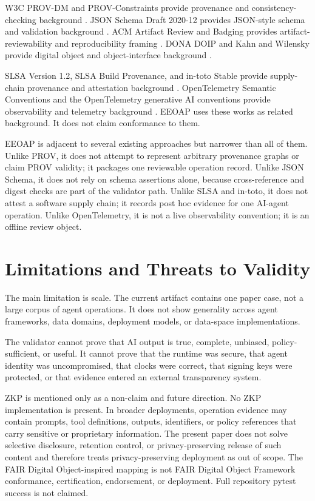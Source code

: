 \documentclass[11pt]{article}
\begin{document}
W3C PROV-DM and PROV-Constraints provide provenance and consistency-checking
background \cite{provdm,provconstraints}. JSON Schema Draft 2020-12 provides
JSON-style schema and validation background \cite{jsonschema}. ACM Artifact
Review and Badging provides artifact-reviewability and reproducibility
framing \cite{acmbadging}. DONA DOIP and Kahn and Wilensky provide digital
object and object-interface background \cite{doip,kahnwilensky}.

SLSA Version 1.2, SLSA Build Provenance, and in-toto Stable provide
supply-chain provenance and attestation background
\cite{slsa,slsaprov,intoto}. OpenTelemetry Semantic Conventions and the
OpenTelemetry generative AI conventions provide observability and telemetry
background \cite{otel,otelgenai}. EEOAP uses these works as related
background. It does not claim conformance to them.

EEOAP is adjacent to several existing approaches but narrower than all of
them. Unlike PROV, it does not attempt to represent arbitrary provenance
graphs or claim PROV validity; it packages one reviewable operation record.
Unlike JSON Schema, it does not rely on schema assertions alone, because
cross-reference and digest checks are part of the validator path. Unlike SLSA
and in-toto, it does not attest a software supply chain; it records post hoc
evidence for one AI-agent operation. Unlike OpenTelemetry, it is not a live
observability convention; it is an offline review object.

\section{Limitations and Threats to Validity}

The main limitation is scale. The current artifact contains one paper case,
not a large corpus of agent operations. It does not show generality across
agent frameworks, data domains, deployment models, or data-space
implementations.

The validator cannot prove that AI output is true, complete, unbiased,
policy-sufficient, or useful. It cannot prove that the runtime was secure,
that agent identity was uncompromised, that clocks were correct, that signing
keys were protected, or that evidence entered an external transparency
system.

ZKP is mentioned only as a non-claim and future direction. No ZKP
implementation is present. In broader deployments, operation evidence may
contain prompts, tool definitions, outputs, identifiers, or policy references
that carry sensitive or proprietary information. The present paper does not
solve selective disclosure, retention control, or privacy-preserving release
of such content and therefore treats privacy-preserving deployment as out of
scope. The FAIR Digital Object-inspired mapping is not FAIR Digital Object
Framework conformance, certification, endorsement, or deployment. Full
repository pytest success is not claimed.
\end{document}
